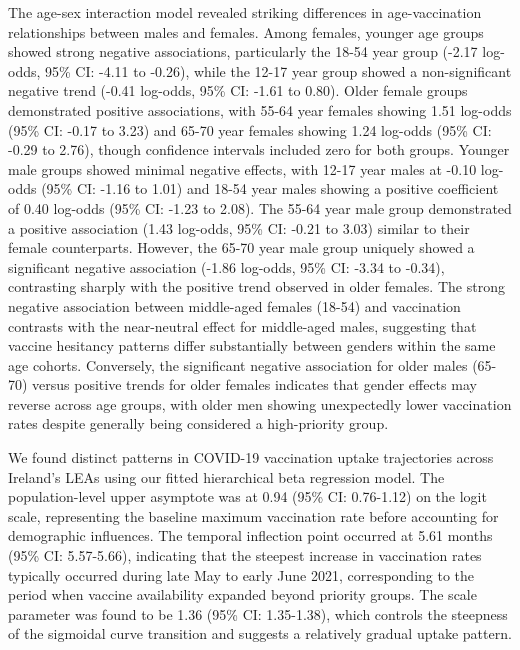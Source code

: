 \documentclass{article}
\begin{document}
The age-sex interaction model revealed striking differences in
age-vaccination relationships between males and females. Among females,
younger age groups showed strong negative associations, particularly the
18-54 year group (-2.17 log-odds, 95\% CI: -4.11 to -0.26), while the
12-17 year group showed a non-significant negative trend (-0.41
log-odds, 95\% CI: -1.61 to 0.80). Older female groups demonstrated
positive associations, with 55-64 year females showing 1.51 log-odds
(95\% CI: -0.17 to 3.23) and 65-70 year females showing 1.24 log-odds
(95\% CI: -0.29 to 2.76), though confidence intervals included zero for
both groups. Younger male groups showed minimal negative effects, with
12-17 year males at -0.10 log-odds (95\% CI: -1.16 to 1.01) and 18-54
year males showing a positive coefficient of 0.40 log-odds (95\% CI:
-1.23 to 2.08). The 55-64 year male group demonstrated a positive
association (1.43 log-odds, 95\% CI: -0.21 to 3.03) similar to their
female counterparts. However, the 65-70 year male group uniquely showed
a significant negative association (-1.86 log-odds, 95\% CI: -3.34 to
-0.34), contrasting sharply with the positive trend observed in older
females. The strong negative association between middle-aged females
(18-54) and vaccination contrasts with the near-neutral effect for
middle-aged males, suggesting that vaccine hesitancy patterns differ
substantially between genders within the same age cohorts. Conversely,
the significant negative association for older males (65-70) versus
positive trends for older females indicates that gender effects may
reverse across age groups, with older men showing unexpectedly lower
vaccination rates despite generally being considered a high-priority
group.

We found distinct patterns in COVID-19 vaccination uptake trajectories
across Ireland's LEAs using our fitted hierarchical beta regression
model. The population-level upper asymptote was at 0.94 (95\% CI:
0.76-1.12) on the logit scale, representing the baseline maximum
vaccination rate before accounting for demographic influences. The
temporal inflection point occurred at 5.61 months (95\% CI: 5.57-5.66),
indicating that the steepest increase in vaccination rates typically
occurred during late May to early June 2021, corresponding to the period
when vaccine availability expanded beyond priority groups. The scale
parameter was found to be 1.36 (95\% CI: 1.35-1.38), which controls the
steepness of the sigmoidal curve transition and suggests a relatively
gradual uptake pattern.
\end{document}

